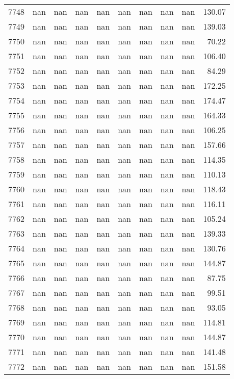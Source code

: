 \begin{tabular}{lrrrrrrrrr}
7748 & nan & nan & nan & nan & nan & nan & nan & nan & 130.07 \\
7749 & nan & nan & nan & nan & nan & nan & nan & nan & 139.03 \\
7750 & nan & nan & nan & nan & nan & nan & nan & nan & 70.22 \\
7751 & nan & nan & nan & nan & nan & nan & nan & nan & 106.40 \\
7752 & nan & nan & nan & nan & nan & nan & nan & nan & 84.29 \\
7753 & nan & nan & nan & nan & nan & nan & nan & nan & 172.25 \\
7754 & nan & nan & nan & nan & nan & nan & nan & nan & 174.47 \\
7755 & nan & nan & nan & nan & nan & nan & nan & nan & 164.33 \\
7756 & nan & nan & nan & nan & nan & nan & nan & nan & 106.25 \\
7757 & nan & nan & nan & nan & nan & nan & nan & nan & 157.66 \\
7758 & nan & nan & nan & nan & nan & nan & nan & nan & 114.35 \\
7759 & nan & nan & nan & nan & nan & nan & nan & nan & 110.13 \\
7760 & nan & nan & nan & nan & nan & nan & nan & nan & 118.43 \\
7761 & nan & nan & nan & nan & nan & nan & nan & nan & 116.11 \\
7762 & nan & nan & nan & nan & nan & nan & nan & nan & 105.24 \\
7763 & nan & nan & nan & nan & nan & nan & nan & nan & 139.33 \\
7764 & nan & nan & nan & nan & nan & nan & nan & nan & 130.76 \\
7765 & nan & nan & nan & nan & nan & nan & nan & nan & 144.87 \\
7766 & nan & nan & nan & nan & nan & nan & nan & nan & 87.75 \\
7767 & nan & nan & nan & nan & nan & nan & nan & nan & 99.51 \\
7768 & nan & nan & nan & nan & nan & nan & nan & nan & 93.05 \\
7769 & nan & nan & nan & nan & nan & nan & nan & nan & 114.81 \\
7770 & nan & nan & nan & nan & nan & nan & nan & nan & 144.87 \\
7771 & nan & nan & nan & nan & nan & nan & nan & nan & 141.48 \\
7772 & nan & nan & nan & nan & nan & nan & nan & nan & 151.58 \\

\end{tabular}
